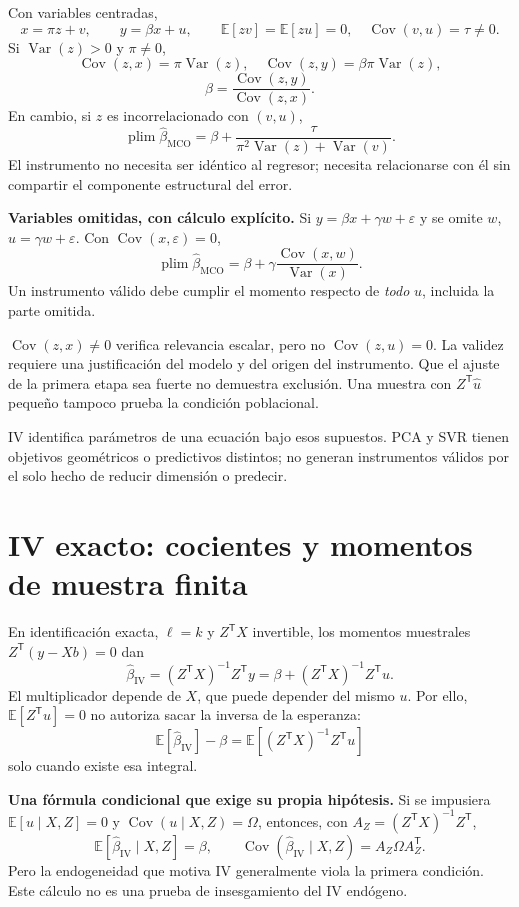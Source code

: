 \documentclass[11pt,a4paper]{article}
\newcommand{\E}{\mathbb E}
\newcommand{\T}{^{\mathsf T}}
\DeclareMathOperator{\Var}{Var}
\DeclareMathOperator{\Cov}{Cov}
\newcommand{\topic}[2]{\clearpage\section{#1}\label{#2}}
\theoremstyle{definition}\newtheorem{definicion}[teorema]{Definición}
\begin{document}
\begin{ejemplo}
Con variables centradas,
\[
x=\pi z+v,\qquad y=\beta x+u,\qquad
\E[zv]=\E[zu]=0,\quad \Cov(v,u)=\tau\ne0.
\]
Si $\Var(z)>0$ y $\pi\ne0$,
\[
\Cov(z,x)=\pi\Var(z),\quad
\Cov(z,y)=\beta\pi\Var(z),
\]
\[
\boxed{\beta=\frac{\Cov(z,y)}{\Cov(z,x)}}.
\]
En cambio, si $z$ es incorrelacionado con $(v,u)$,
\[
\operatorname{plim}\widehat\beta_{\mathrm{MCO}}
=\beta+\frac{\tau}{\pi^2\Var(z)+\Var(v)}.
\]
El instrumento no necesita ser idéntico al regresor; necesita relacionarse
con él sin compartir el componente estructural del error.
\end{ejemplo}
\textbf{Variables omitidas, con cálculo explícito.}
Si $y=\beta x+\gamma w+\varepsilon$ y se omite $w$,
$u=\gamma w+\varepsilon$.
Con $\Cov(x,\varepsilon)=0$,
\[
\operatorname{plim}\widehat\beta_{\mathrm{MCO}}
=\beta+\gamma\frac{\Cov(x,w)}{\Var(x)}.
\]
Un instrumento válido debe cumplir el momento respecto de \emph{todo}
$u$, incluida la parte omitida.

\begin{cuidado}
$\Cov(z,x)\ne0$ verifica relevancia escalar, pero no $\Cov(z,u)=0$.
La validez requiere una justificación del modelo y del origen del instrumento.
Que el ajuste de la primera etapa sea fuerte no demuestra exclusión.
Una muestra con $Z\T\widehat u$ pequeño tampoco prueba la condición poblacional.
\end{cuidado}
IV identifica parámetros de una ecuación bajo esos supuestos.
PCA y SVR tienen objetivos geométricos o predictivos distintos; no generan
instrumentos válidos por el solo hecho de reducir dimensión o predecir.

\topic{IV exacto: cocientes y momentos de muestra finita}{s44}
En identificación exacta, $\ell=k$ y $Z\T X$ invertible,
los momentos muestrales $Z\T(y-Xb)=0$ dan
\[
\boxed{\widehat\beta_{\mathrm{IV}}=(Z\T X)^{-1}Z\T y
=\beta+(Z\T X)^{-1}Z\T u}.
\]
El multiplicador depende de $X$, que puede depender del mismo $u$.
Por ello, $\E[Z\T u]=0$ no autoriza sacar la inversa de la esperanza:
\[
\E[\widehat\beta_{\mathrm{IV}}]-\beta
=\E[(Z\T X)^{-1}Z\T u]
\]
solo cuando existe esa integral.

\textbf{Una fórmula condicional que exige su propia hipótesis.}
Si se impusiera $\E[u\mid X,Z]=0$ y
$\Cov(u\mid X,Z)=\Omega$, entonces, con
$A_Z=(Z\T X)^{-1}Z\T$,
\[
\E[\widehat\beta_{\mathrm{IV}}\mid X,Z]=\beta,\qquad
\Cov(\widehat\beta_{\mathrm{IV}}\mid X,Z)=A_Z\Omega A_Z\T.
\]
Pero la endogeneidad que motiva IV generalmente viola la primera condición.
Este cálculo no es una prueba de insesgamiento del IV endógeno.
\end{document}
